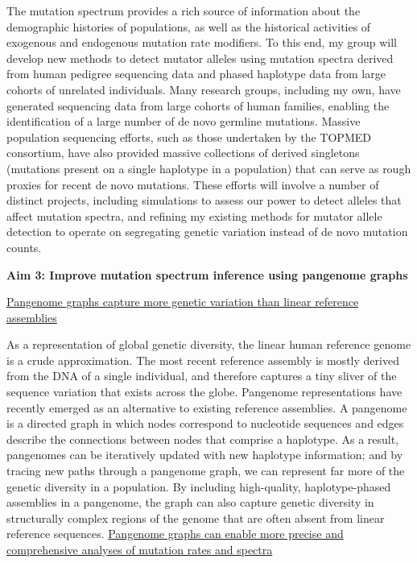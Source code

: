 \documentclass[11pt,a4paper,sans]{moderncv}
\begin{document}
The mutation spectrum provides a rich source of information about the demographic 
histories of populations, as well as the historical activities of exogenous and 
endogenous mutation rate modifiers. To this end, my group will develop new methods
to detect mutator alleles using mutation spectra derived from human pedigree 
sequencing data and phased haplotype data from large cohorts of unrelated 
individuals. Many research groups, including my own, have generated sequencing 
data from large cohorts of human families, enabling the identification of a 
large number of de novo germline mutations. Massive population sequencing efforts,
such as those undertaken by the TOPMED consortium, have also provided massive 
collections of derived singletons (mutations present on a single haplotype in 
a population) that can serve as rough proxies for recent de novo mutations. 
These efforts will involve a number of distinct projects, including simulations
to assess our power to detect alleles that affect mutation spectra, and 
refining my existing methods for mutator allele detection to operate on 
segregating genetic variation instead of de novo mutation counts.
\break \break

\textbf{Aim 3: Improve mutation spectrum inference using pangenome graphs}

\underline{Pangenome graphs capture more genetic variation than linear reference assemblies}


As a representation of global genetic diversity, the linear human reference genome 
is a crude approximation. The most recent reference assembly is mostly derived from
the DNA of a single individual, and therefore captures a tiny sliver of the 
sequence variation that exists across the globe. Pangenome representations have 
recently emerged as an alternative to existing reference assemblies. A pangenome 
is a directed graph in which nodes correspond to nucleotide sequences and edges 
describe the connections between nodes that comprise a haplotype. As a result, 
pangenomes can be iteratively updated with new haplotype information; and by 
tracing new paths through a pangenome graph, we can represent far more of the 
genetic diversity in a population. By including high-quality, haplotype-phased 
assemblies in a pangenome, the graph can also capture genetic diversity in 
structurally complex regions of the genome that are often absent from linear 
reference sequences. 
\break \break
\underline{Pangenome graphs can enable more precise and comprehensive analyses of mutation rates and spectra}
\end{document}
